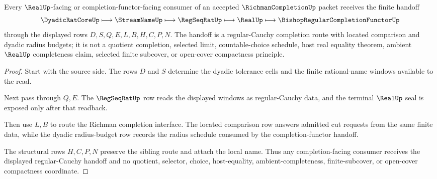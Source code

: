 \begin{theorem}
\label{thm:richman-completion-regular-cauchy-handoff}
Every $\RealUp$-facing or completion-functor-facing consumer of an accepted $\RichmanCompletionUp$ packet receives the finite handoff
$$
\DyadicRatCoreUp \longmapsto \StreamNameUp \longmapsto \RegSeqRatUp \longmapsto \RealUp \longmapsto \BishopRegularCompletionFunctorUp
$$
through the displayed rows $D,S,Q,E,L,B,H,C,P,N$. The handoff is a regular-Cauchy completion route with located comparison and dyadic radius budgets; it is not a quotient completion, selected limit, countable-choice schedule, host real equality theorem, ambient $\RealUp$ completeness claim, selected finite subcover, or open-cover compactness principle.
\end{theorem}
\begin{proof}
Start with the source side. The rows $D$ and $S$ determine the dyadic tolerance cells and the finite rational-name windows available to the read.

Next pass through $Q,E$. The $\RegSeqRatUp$ row reads the displayed windows as regular-Cauchy data, and the terminal $\RealUp$ seal is exposed only after that readback.

Then use $L,B$ to route the Richman completion interface. The located comparison row answers admitted cut requests from the same finite data, while the dyadic radius-budget row records the radius schedule consumed by the completion-functor handoff.

The structural rows $H,C,P,N$ preserve the sibling route and attach the local name. Thus any completion-facing consumer receives the displayed regular-Cauchy handoff and no quotient, selector, choice, host-equality, ambient-completeness, finite-subcover, or open-cover compactness coordinate.
\end{proof}




